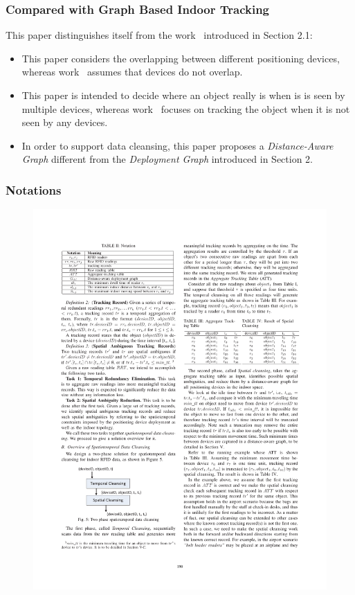 
\begin{frame}
\frametitle{Compared with Graph Based Indoor Tracking~\cite{DBLP:conf/mdm/JensenLY09}}

This paper distinguishes itself from the work~\cite{DBLP:conf/mdm/JensenLY09} introduced in Section 2.1:

\begin{itemize}
  \item This paper considers the overlapping between different positioning devices, whereas work~\cite{DBLP:conf/mdm/JensenLY09} assumes that devices do not overlap.
  \item This paper is intended to decide where an object really is when is is seen by multiple devices, whereas work~\cite{DBLP:conf/mdm/JensenLY09} focuses on tracking the object when it is not seen by any devices.
  \item In order to support data cleansing, this paper proposes a \emph{Distance-Aware Graph} different from the \emph{Deployment Graph} introduced in Section 2.
\end{itemize}

\end{frame}


\begin{frame}
\frametitle{Notations}

\begin{figure}[tb]
  \includegraphics[width=\columnwidth]{figures/3-2/3-2-3.pdf}
\end{figure}

\end{frame}

